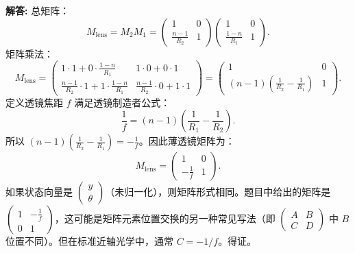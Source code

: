 \documentclass[12pt, a4paper, oneside]{ctexart}
\newenvironment{solution}{\par\noindent\textbf{解答:}\quad}{\par}
\begin{document}
\begin{solution}
    总矩阵：
    \[
    M_{\text{lens}} = M_2 M_1 = \begin{pmatrix} 1 & 0 \\ \frac{n-1}{R_2} & 1 \end{pmatrix} \begin{pmatrix} 1 & 0 \\ \frac{1-n}{R_1} & 1 \end{pmatrix}.
    \]
    矩阵乘法：
    \[
    M_{\text{lens}} = \begin{pmatrix} 1 \cdot 1 + 0 \cdot \frac{1-n}{R_1} & 1 \cdot 0 + 0 \cdot 1 \\ \frac{n-1}{R_2} \cdot 1 + 1 \cdot \frac{1-n}{R_1} & \frac{n-1}{R_2} \cdot 0 + 1 \cdot 1 \end{pmatrix} = \begin{pmatrix} 1 & 0 \\ (n-1)\left( \frac{1}{R_2} - \frac{1}{R_1} \right) & 1 \end{pmatrix}.
    \]
    定义透镜焦距 $f$ 满足透镜制造者公式：
    \[
    \frac{1}{f} = (n-1)\left( \frac{1}{R_1} - \frac{1}{R_2} \right).
    \]
    所以 $(n-1)\left( \frac{1}{R_2} - \frac{1}{R_1} \right) = -\frac{1}{f}$。因此薄透镜矩阵为：
    \[
    M_{\text{lens}} = \begin{pmatrix} 1 & 0 \\ -\frac{1}{f} & 1 \end{pmatrix}.
    \]
    如果状态向量是 $\begin{pmatrix} y \\ \theta \end{pmatrix}$（未归一化），则矩阵形式相同。题目中给出的矩阵是 $\begin{pmatrix} 1 & -\frac{1}{f} \\ 0 & 1 \end{pmatrix}$，这可能是矩阵元素位置交换的另一种常见写法（即 $\begin{pmatrix} A & B \\ C & D \end{pmatrix}$ 中 $B$ 位置不同）。但在标准近轴光学中，通常 $C = -1/f$。得证。
\end{solution}
\end{document}
